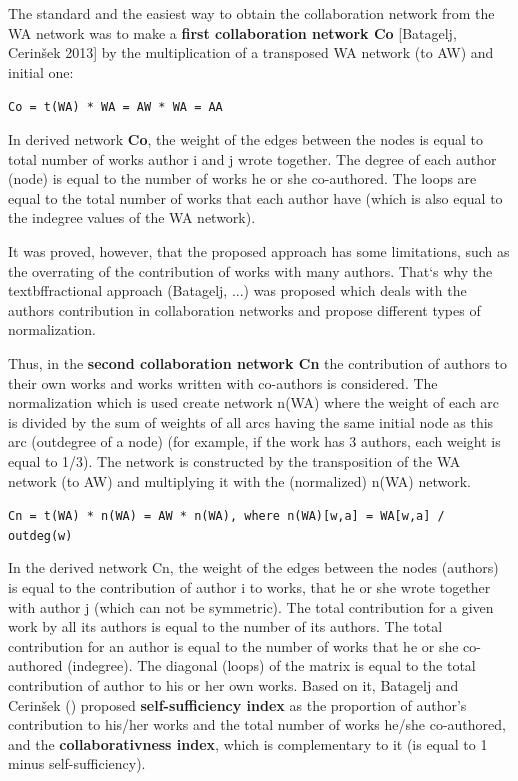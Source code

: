 \documentclass[11pt]{article} %
\begin{document}
The standard and the easiest way to obtain the collaboration network from the WA network was to make a \textbf{first collaboration network Co} [Batagelj, Cerinšek 2013] by the multiplication of a transposed WA network (to AW) and initial one: \medskip 

\texttt{Co = t(WA) * WA = AW * WA = AA} \medskip  

In derived network  \textbf{Co}, the weight of the edges between the nodes is equal to total number of works author i and j wrote together. The degree of each author (node) is equal to the number of works he or she co-authored. The loops are equal to the total number of works that each author have (which is also equal to the indegree values of the WA network). \medskip 

It was proved, however, that the proposed approach has some limitations, such as the overrating of the contribution of works with many authors. That`s why the textbf{fractional approach} (Batagelj, ...) was proposed which deals with the authors contribution in collaboration networks and propose different types of normalization. \medskip 

Thus, in the \textbf{second collaboration network Cn} the contribution of authors to their own works and works written with co-authors is considered. The normalization which is used create network n(WA) where the weight of each arc is divided by the sum of weights of all arcs having the same initial node as this arc (outdegree of a node) (for example, if the work has 3 authors, each weight is equal to 1/3). The network is constructed by the transposition of the WA network (to AW) and multiplying it with the (normalized) n(WA) network.\medskip 

\texttt{Cn = t(WA) * n(WA) = AW * n(WA), where n(WA)[w,a] = WA[w,a] / outdeg(w)} \medskip 

In the derived network Cn, the weight of the edges between the nodes (authors) is equal to the contribution of author i to works, that he or she wrote together with author j (which can not be symmetric). The total contribution for a given work by all its authors is equal to the number of its authors. The total contribution for an author is equal to the number of works that he or she co-authored (indegree). The diagonal (loops) of the matrix is equal to the total contribution of author to his or her own works. Based on it, Batagelj and Cerinšek () proposed \textbf{self-sufficiency index} as the proportion of author's contribution to his/her works and the total number of works he/she co-authored, and the \textbf{collaborativness index}, which is complementary to it (is equal to 1 minus self-sufficiency). \medskip 
\end{document}
